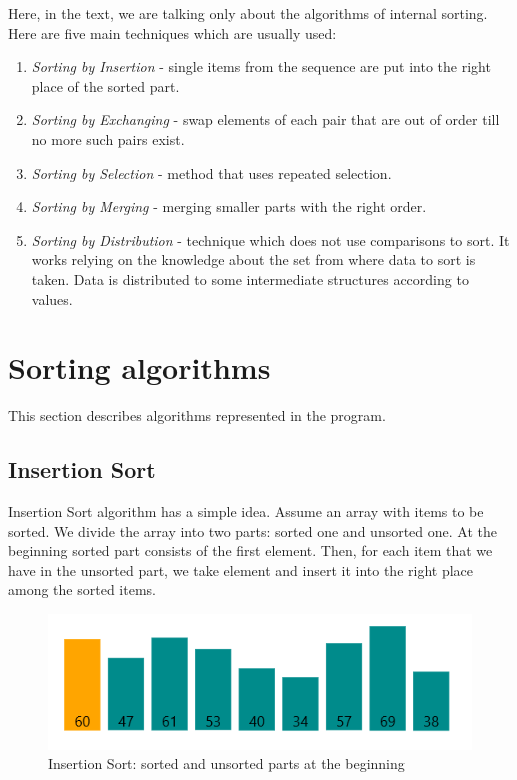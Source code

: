 \documentclass[
  field=inf,
  biblatex,
  language=english,
  glossaries,
  theorems=false,
  sourcecodes=false,
  index
]{kidiplom}
\begin{document}
Here, in the text, we are talking only about the algorithms of internal sorting. Here are five main techniques which are usually used\cite{knuth3}:
\begin{enumerate}
	\item \textit{Sorting by Insertion} - single items from the sequence are put into the right place of the sorted part.
	\item \textit{Sorting by Exchanging} - swap elements of each pair that are out of order till no more such pairs exist.
	\item \textit{Sorting by Selection} - method that uses repeated selection.
	\item \textit{Sorting by Merging} - merging smaller parts with the right order.
	\item \textit{Sorting by Distribution} - technique which does not use comparisons to sort. It works relying on the knowledge about the set from where data to sort is taken. Data is distributed to some intermediate structures according to values. %
\end{enumerate}

\newpage
\section{Sorting algorithms}

This section describes algorithms represented in the program.

\subsection{Insertion Sort}
\label{sec:insertion}
Insertion Sort algorithm has a simple idea. Assume an array with items to be sorted. We divide the array into two parts: sorted one and unsorted one. At the beginning sorted part consists of the first element. Then, for each item that we have in the unsorted part, we take element and insert it into the right place among the sorted items.

\begin{figure}[H]
\begin{center}
	
	\includegraphics[scale=0.7]{img/Insertion.png}
	\caption{Insertion Sort: sorted and unsorted parts at the beginning}\label{fig:insert}
\end{center}
\end{figure}
\end{document}
